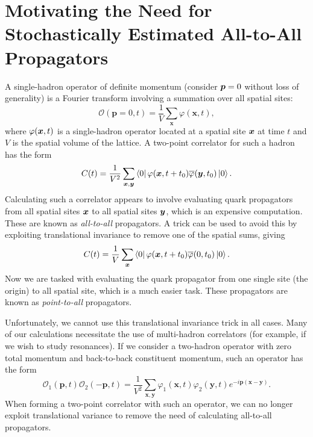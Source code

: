 \section{Motivating the Need for Stochastically Estimated All-to-All Propagators}
A single-hadron operator of definite momentum (consider $\boldsymbol{p} = 0$ without loss of generality) is a Fourier transform involving a summation over all spatial sites:
\begin{equation}
    \mathcal{O}(\boldsymbol{p}= 0, t)=\frac{1}{V} \sum_{\boldsymbol{x}} \varphi(\boldsymbol{x}, t),
\end{equation}
where $\varphi(\boldsymbol{x}, t)$ is a single-hadron operator located at a spatial site $\boldsymbol{x}$ at time $t$ and $V$ is the spatial volume of the lattice. A two-point correlator for such a hadron has the form
\begin{equation}
    C(t) = \frac{1}{V^2} \sum_{\boldsymbol{x}, \boldsymbol{y}} \bra 0\varphi(\boldsymbol{x}, t+t_0)\overline\varphi(\boldsymbol{y}, t_0) \ket 0.
\end{equation}
Calculating such a correlator appears to involve evaluating quark propagators from all spatial sites $\boldsymbol{x}$ to all spatial sites $\boldsymbol{y}$, which is an expensive computation. These are known as \emph{all-to-all} propagators. A trick can be used to avoid this by exploiting translational invariance to remove one of the spatial sums, giving
\begin{equation}
    C(t) = \frac{1}{V} \sum_{\boldsymbol{x}} \bra 0 \varphi(\boldsymbol{x}, t+t_0) \overline\varphi(0, t_0) \ket 0.
\end{equation}
Now we are tasked with evaluating the quark propagator from one single site (the origin) to all spatial site, which is a much easier task. These propagators are known as \emph{point-to-all} propagators.

Unfortunately, we cannot use this translational invariance trick in all cases. Many of our calculations necessitate the use of multi-hadron correlators (for example, if we wish to study resonances). If we consider a two-hadron operator with zero total momentum and back-to-back constituent momentum, such an operator has the form
\begin{equation}
    \mathcal{O}_{1}(\boldsymbol{p}, t) \mathcal{O}_{2}(-\boldsymbol{p}, t)=\frac{1}{V^{2}} \sum_{\boldsymbol{x}, \boldsymbol{y}} \varphi_{1}(\boldsymbol{x}, t) \varphi_{2}(\boldsymbol{y}, t) e^{-i \boldsymbol{p}(\boldsymbol{x}-\boldsymbol{y})}.
\end{equation}
When forming a two-point correlator with such an operator, we can no longer exploit translational variance to remove the need of calculating all-to-all propagators.

